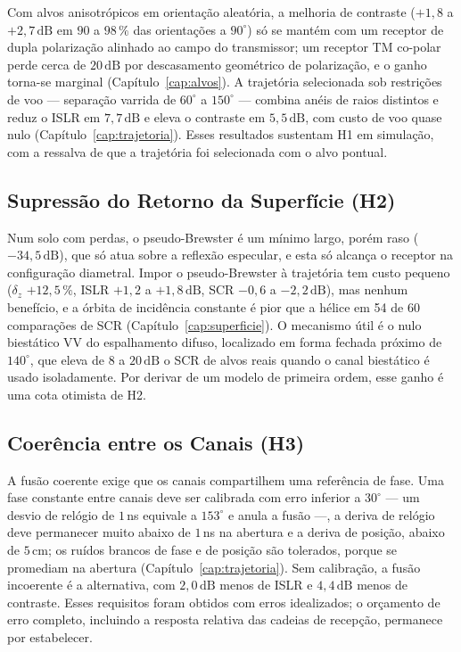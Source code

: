 \documentclass[12pt,a4paper,oneside]{book}
\theoremstyle{remark}
\newcommand{\dB}{\,\mathrm{dB}}
\theoremstyle{plain}
\theoremstyle{definition}
\begin{document}
Com alvos anisotrópicos em orientação aleatória, a melhoria de contraste
($+1,8$ a $+2,7\dB$ em $90$ a $98\,\%$ das orientações a $90^\circ$) só se mantém com um
receptor de dupla polarização alinhado ao campo do transmissor; um receptor TM
co-polar perde cerca de $20\dB$ por descasamento geométrico de polarização, e o
ganho torna-se marginal (Capítulo~\ref{cap:alvos}). A trajetória selecionada sob
restrições de voo --- separação varrida de $60^\circ$ a $150^\circ$ --- combina anéis de
raios distintos e reduz o ISLR em $7,7\dB$ e eleva o contraste em $5,5\dB$, com custo
de voo quase nulo (Capítulo~\ref{cap:trajetoria}). Esses resultados sustentam H1 em
simulação, com a ressalva de que a trajetória foi selecionada com o alvo pontual.

\subsection{Supressão do Retorno da Superfície (H2)}

Num solo com perdas, o pseudo-Brewster é um mínimo largo, porém raso
($-34,5\dB$), que só atua sobre a reflexão especular, e esta só alcança o receptor
na configuração diametral. Impor o pseudo-Brewster à trajetória tem custo pequeno
($\delta_z$ $+12,5\,\%$, ISLR $+1,2$ a $+1,8\dB$, SCR $-0,6$ a $-2,2\dB$), mas nenhum
benefício, e a órbita de incidência constante é pior que a hélice em 54 de 60
comparações de SCR (Capítulo~\ref{cap:superficie}). O mecanismo útil é o nulo
biestático VV do espalhamento difuso, localizado em forma fechada próximo de
$140^\circ$, que eleva de $8$ a $20\dB$ o SCR de alvos reais quando o canal biestático
é usado isoladamente. Por derivar de um modelo de primeira ordem, esse ganho é uma
cota otimista de H2.

\subsection{Coerência entre os Canais (H3)}

A fusão coerente exige que os canais compartilhem uma referência de fase. Uma fase
constante entre canais deve ser calibrada com erro inferior a $30^\circ$ --- um desvio
de relógio de $1\,$ns equivale a $153^\circ$ e anula a fusão ---, a deriva de relógio
deve permanecer muito abaixo de $1\,$ns na abertura e a deriva de posição, abaixo de
$5\,$cm; os ruídos brancos de fase e de posição são tolerados, porque se promediam na
abertura (Capítulo~\ref{cap:trajetoria}). Sem calibração, a fusão incoerente é a
alternativa, com $2,0\dB$ menos de ISLR e $4,4\dB$ menos de contraste. Esses
requisitos foram obtidos com erros idealizados; o orçamento de erro completo,
incluindo a resposta relativa das cadeias de recepção, permanece por estabelecer.
\end{document}
